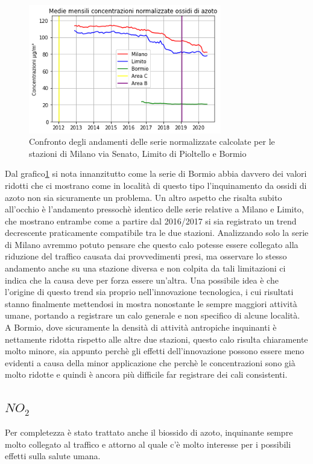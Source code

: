 \documentclass[a4paper,12pt]{report}
\begin{document}
\begin{figure}[h]
\centering
\includegraphics[width=0.75\textwidth]{nox_traffico}
\caption{Confronto degli andamenti delle serie normalizzate calcolate per le stazioni di Milano via Senato, Limito di Pioltello e Bormio}
\label{fig:nox_traffico}
\end{figure}

Dal grafico\ref{fig:nox_traffico} si nota innanzitutto come la serie di Bormio abbia davvero dei valori ridotti che ci mostrano come in località di questo tipo l'inquinamento da ossidi di azoto non sia sicuramente un problema.
Un altro aspetto che risalta subito all'occhio è l'andamento pressochè identico delle serie relative a Milano e Limito, che mostrano entrambe come a partire dal 2016/2017 si sia registrato un trend decrescente praticamente compatibile tra le due stazioni. Analizzando solo la serie di Milano avremmo potuto pensare che questo calo potesse essere collegato alla riduzione del traffico causata dai provvedimenti presi, ma osservare lo stesso andamento anche su una stazione diversa e non colpita da tali limitazioni ci indica che la causa deve per forza essere un'altra. Una possibile idea è che l'origine di questo trend sia proprio nell'innovazione tecnologica, i cui risultati stanno finalmente mettendosi in mostra nonostante le sempre maggiori attività umane, portando a registrare un calo generale e non specifico di alcune località. A Bormio, dove sicuramente la densità di attività antropiche inquinanti è nettamente ridotta rispetto alle altre due stazioni, questo calo risulta chiaramente molto minore, sia appunto perchè gli effetti dell'innovazione possono essere meno evidenti a causa della minor applicazione che perchè le concentrazioni sono già molto ridotte e quindi è ancora più difficile far registrare dei cali consistenti.

\subsection{$NO_2$}
Per completezza è stato trattato anche il biossido di azoto, inquinante sempre molto collegato al traffico e attorno al quale c'è molto interesse per i possibili effetti sulla salute umana.
\end{document}
